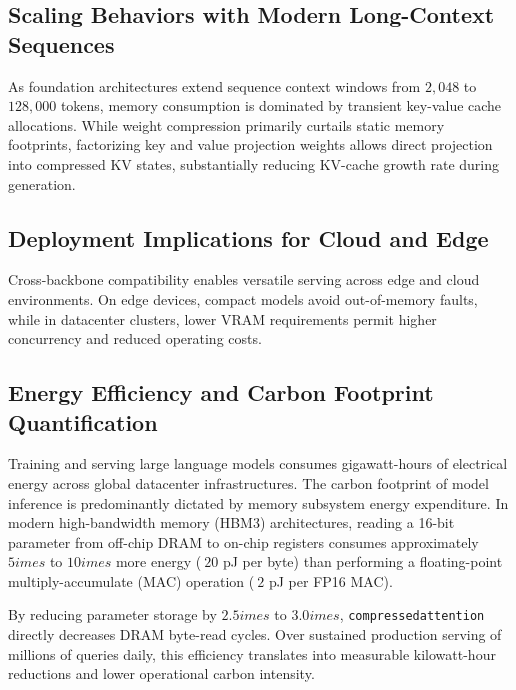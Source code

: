 \subsection{Scaling Behaviors with Modern Long-Context Sequences}
As foundation architectures extend sequence context windows from $2{,}048$ to $128{,}000$ tokens, memory consumption is dominated by transient key-value cache allocations. While weight compression primarily curtails static memory footprints, factorizing key and value projection weights allows direct projection into compressed KV states, substantially reducing KV-cache growth rate during generation.

\subsection{Deployment Implications for Cloud and Edge}
Cross-backbone compatibility enables versatile serving across edge and cloud environments. On edge devices, compact models avoid out-of-memory faults, while in datacenter clusters, lower VRAM requirements permit higher concurrency and reduced operating costs.

\subsection{Energy Efficiency and Carbon Footprint Quantification}
Training and serving large language models consumes gigawatt-hours of electrical energy across global datacenter infrastructures. The carbon footprint of model inference is predominantly dictated by memory subsystem energy expenditure. In modern high-bandwidth memory (HBM3) architectures, reading a 16-bit parameter from off-chip DRAM to on-chip registers consumes approximately $5	imes$ to $10	imes$ more energy ($~20$ pJ per byte) than performing a floating-point multiply-accumulate (MAC) operation ($~2$ pJ per FP16 MAC).

By reducing parameter storage by $2.5	imes$ to $3.0	imes$, \texttt{compressedattention} directly decreases DRAM byte-read cycles. Over sustained production serving of millions of queries daily, this efficiency translates into measurable kilowatt-hour reductions and lower operational carbon intensity.
